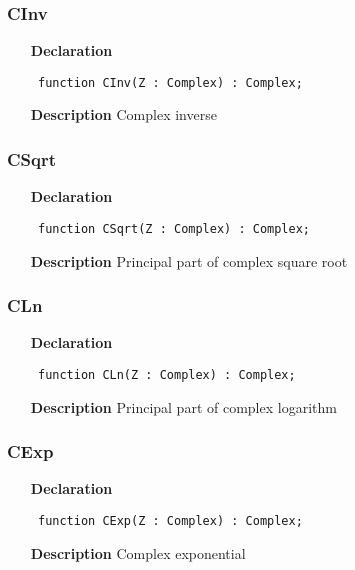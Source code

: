 \documentclass[12pt,a4paper,oneside]{report}
\newcommand{\declarationitem}[1]{\textbf{#1}}
\newcommand{\descriptiontitle}[1]{\textbf{#1}}
\newcommand{\code}[1]{\texttt{#1}}
\begin{document}
\subsubsection{CInv}
\label{ucomplex-CInv}
\begin{itemize}\item[\declarationitem{Declaration}\hfill]
\begin{flushleft}
\code{
function CInv(Z : Complex) : Complex;}

\end{flushleft}

\par
\item[\descriptiontitle{Description}]
Complex inverse

\end{itemize}
\subsubsection{CSqrt}
\label{ucomplex-CSqrt}
\begin{itemize}\item[\declarationitem{Declaration}\hfill]
\begin{flushleft}
\code{
function CSqrt(Z : Complex) : Complex;}

\end{flushleft}

\par
\item[\descriptiontitle{Description}]
Principal part of complex square root

\end{itemize}
\subsubsection{CLn}
\label{ucomplex-CLn}
\begin{itemize}\item[\declarationitem{Declaration}\hfill]
\begin{flushleft}
\code{
function CLn(Z : Complex) : Complex;}

\end{flushleft}

\par
\item[\descriptiontitle{Description}]
Principal part of complex logarithm

\end{itemize}
\subsubsection{CExp}
\label{ucomplex-CExp}
\begin{itemize}\item[\declarationitem{Declaration}\hfill]
\begin{flushleft}
\code{
function CExp(Z : Complex) : Complex;}

\end{flushleft}

\par
\item[\descriptiontitle{Description}]
Complex exponential

\end{itemize}
\end{document}
